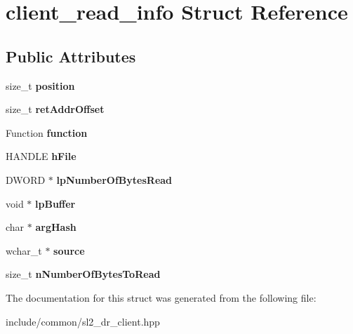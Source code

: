 \hypertarget{structclient__read__info}{}\section{client\+\_\+read\+\_\+info Struct Reference}
\label{structclient__read__info}
\subsection*{Public Attributes}
\begin{DoxyCompactItemize}
\item 
\mbox{\label{structclient__read__info_a30a942a1e47f0ddc7a12ab4b46e29897}} 
size\+\_\+t {\bfseries position}
\item 
\mbox{\label{structclient__read__info_a33c1031b2763e51003bb58ecc1408061}} 
size\+\_\+t {\bfseries ret\+Addr\+Offset}
\item 
\mbox{\label{structclient__read__info_ac400ceec2814763814ff85dfea476b6d}} 
Function {\bfseries function}
\item 
\mbox{\label{structclient__read__info_ada8192a6b81f7a52522e2130aed809fc}} 
H\+A\+N\+D\+LE {\bfseries h\+File}
\item 
\mbox{\label{structclient__read__info_abb4552a7eaaf736533806b401fe886dc}} 
D\+W\+O\+RD $\ast$ {\bfseries lp\+Number\+Of\+Bytes\+Read}
\item 
\mbox{\label{structclient__read__info_a29e812aae2dea03acbfb447ce9f7920e}} 
void $\ast$ {\bfseries lp\+Buffer}
\item 
\mbox{\label{structclient__read__info_aa570dadf6409f9fa8d1c89b010728ed9}} 
char $\ast$ {\bfseries arg\+Hash}
\item 
\mbox{\label{structclient__read__info_a2ef82cb59ed327caea785a7f8a28e8cd}} 
wchar\+\_\+t $\ast$ {\bfseries source}
\item 
\mbox{\label{structclient__read__info_a805c4455ea0e03b9eec09a45bf130d37}} 
size\+\_\+t {\bfseries n\+Number\+Of\+Bytes\+To\+Read}
\end{DoxyCompactItemize}


The documentation for this struct was generated from the following file\+:\begin{DoxyCompactItemize}
\item 
include/common/sl2\+\_\+dr\+\_\+client.\+hpp\end{DoxyCompactItemize}
